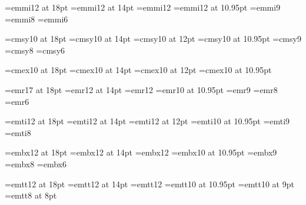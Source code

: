 


\font\eighteeni=emmi12 at 18pt  %
\font\fourteeni=emmi12 at 14pt  %
\font\twelvei=emmi12            %
\font\eleveni=emmi12 at 10.95pt %
\font\ninei=emmi9               %
\font\eighti=emmi8              %
\font\sixi=emmi6                %

\font\eighteensy=cmsy10 at 18pt %
\font\fourteensy=cmsy10 at 14pt %
\font\twelvesy=cmsy10 at 12pt   %
\font\elevensy=cmsy10 at 10.95pt        %
\font\ninesy=cmsy9              %
\font\eightsy=cmsy8             %
\font\sixsy=cmsy6               %

\font\eighteenex=cmex10 at 18pt %
\font\fourteenex=cmex10 at 14pt %
\font\twelveex=cmex10 at 12pt           %
\font\elevenex=cmex10 at 10.95pt        %

\font\eighteenrm=emr17 at 18pt  %
\font\fourteenrm=emr12 at 14pt  %
\font\twelverm=emr12
\font\elevenrm=emr10 at 10.95pt %
\font\ninerm=emr9
\font\eightrm=emr8
\font\sixrm=emr6                %

\font\eighteenit=emti12 at 18pt %
\font\fourteenit=emti12 at 14pt %
\font\twelveit=emti12 at 12pt   %
\font\elevenit=emti10 at 10.95pt                %
\font\nineit=emti9
\font\eightit=emti8             %

\font\eighteenbf=embx12 at 18pt %
\font\fourteenbf=embx12 at 14pt %
\font\twelvebf=embx12
\font\elevenbf=embx10 at 10.95pt                %
\font\ninebf=embx9
\font\eightbf=embx8             %
\font\sixbf=embx6               %

\font\eighteentt=emtt12 at 18pt %
\font\fourteentt=emtt12 at 14pt %
\font\twelvett=emtt12           %
\font\eleventt=emtt10 at 10.95pt        %
\font\ninett=emtt10 at 9pt      %
\font\eighttt=emtt8 at 8pt      %

